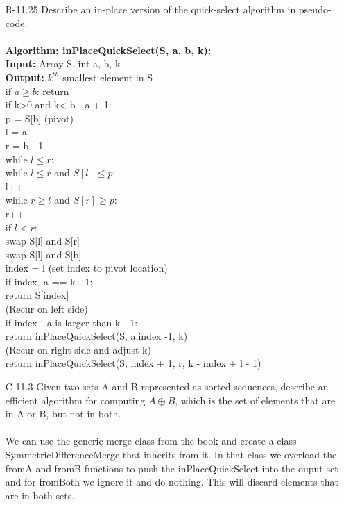 \begin{itemize}
      \item[R-11.25] Describe an in-place version of the quick-select algorithm in pseudo-code.\\
            \answer \\
            \textbf{Algorithm: inPlaceQuickSelect(S, a, b, k):} \\
            \tab\textbf{Input: } Array S, int a, b, k \\
            \tab\textbf{Output: } $k^{th}$ smallest element in S\\
            if $a \geq b$: return \\
            if k>0 and k< b - a + 1:\\
            \tab p = S[b] (pivot)\\
            \tab l = a \\
            \tab r = b - 1 \\
            \tab while $l \leq r$:\\
            \tab[1cm] while $l \leq r$ and $S[l] \leq p$:\\
            \tab[1.5cm] l++\\
            \tab[1cm]while $r\geq l$ and $S[r] \geq p$:\\
            \tab[1.5cm]r++ \\
            \tab[1cm] if $l < r$: \\
            \tab[1.5cm] swap S[l] and S[r] \\
            swap S[l] and S[b] \\
            index = l (set index to pivot location)\\
            if index -a == k - 1:\\
            \tab return S[index] \\
            (Recur on left side)\\
            if index - a is larger than k - 1:\\
            \tab return inPlaceQuickSelect(S, a,index -1, k)\\
            (Recur on right side and adjust k)\\
            return inPlaceQuickSelect(S, index + 1, r, k - index + l  - 1)

      \item[C-11.3]  Given two sets A and B represented as sorted sequences, describe an efficient
            algorithm for computing $A \oplus B$, which is the set of elements that are
            in A or B, but not in both. \\
            \answer \\
            We can use the generic merge class from the book and create a class SymmetricDifferenceMerge
            that inherits from it. In that class we overload the fromA and fromB functions to push the inPlaceQuickSelect
            into the ouput set and for fromBoth we ignore it and do nothing. This will discard elements that are in both sets.








\end{itemize}
